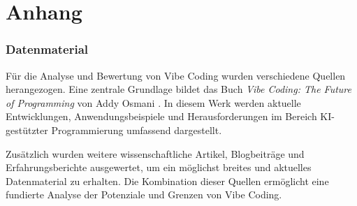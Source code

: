 \documentclass[paper=a4,fontsize=12pt,ngerman]{scrartcl}
\begin{document}
\clearpage
\appendix
\part*{Anhang}

\section{Datenmaterial}
Für die Analyse und Bewertung von Vibe Coding wurden verschiedene Quellen herangezogen. Eine zentrale Grundlage bildet das Buch \textit{Vibe Coding: The Future of Programming} von Addy Osmani \citep{VibeCodingTheFutureOfProgramming}. In diesem Werk werden aktuelle Entwicklungen, Anwendungsbeispiele und Herausforderungen im Bereich KI-gestützter Programmierung umfassend dargestellt.

Zusätzlich wurden weitere wissenschaftliche Artikel, Blogbeiträge und Erfahrungsberichte ausgewertet, um ein möglichst breites und aktuelles Datenmaterial zu erhalten. Die Kombination dieser Quellen ermöglicht eine fundierte Analyse der Potenziale und Grenzen von Vibe Coding.
\end{document}
